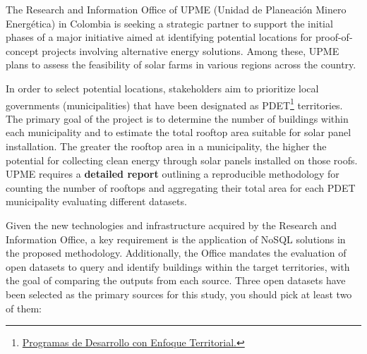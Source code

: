 \documentclass[12pt]{article}
\begin{document}
The Research and Information Office of UPME (Unidad de Planeación Minero Energética) in Colombia is seeking a strategic partner to support the initial phases of a major initiative aimed at identifying potential locations for proof-of-concept projects involving alternative energy solutions. Among these, UPME plans to assess the feasibility of solar farms in various regions across the country.

In order to select potential locations, stakeholders aim to prioritize local governments (municipalities) that have been designated as PDET\footnote{\href{https://centralpdet.renovacionterritorio.gov.co/conoce-los-pdet/}{Programas de Desarrollo con Enfoque Territorial.}} territories. The primary goal of the project is to determine the number of buildings within each municipality and to estimate the total rooftop area suitable for solar panel installation. The greater the rooftop area in a municipality, the higher the potential for collecting clean energy through solar panels installed on those roofs. UPME requires a \textbf{detailed report} outlining a reproducible methodology for counting the number of rooftops and aggregating their total area for each PDET municipality evaluating different datasets.

Given the new technologies and infrastructure acquired by the Research and Information Office, a key requirement is the application of NoSQL solutions in the proposed methodology. Additionally, the Office mandates the evaluation of open datasets to query and identify buildings within the target territories, with the goal of comparing the outputs from each source. Three open datasets have been selected as the primary sources for this study, you should pick at least two of them:
\end{document}
